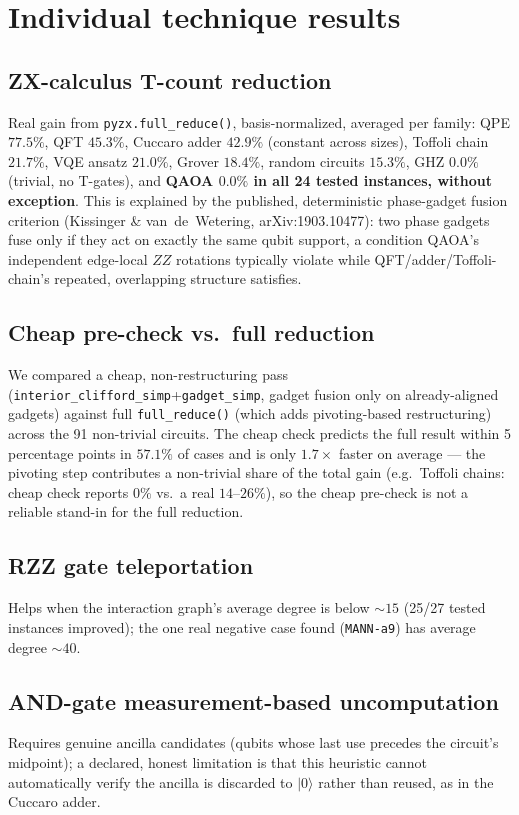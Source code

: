 \documentclass[9pt,twocolumn]{extarticle}
\begin{document}
\section{Individual technique results}
\label{sec:results}

\subsection{ZX-calculus T-count reduction}
Real gain from \texttt{pyzx.full\_reduce()}, basis-normalized, averaged per
family: QPE $77.5\%$, QFT $45.3\%$, Cuccaro adder $42.9\%$ (constant across
sizes), Toffoli chain $21.7\%$, VQE ansatz $21.0\%$, Grover $18.4\%$, random
circuits $15.3\%$, GHZ $0.0\%$ (trivial, no T-gates), and \textbf{QAOA
$0.0\%$ in all 24 tested instances, without exception}. This is explained by
the published, deterministic phase-gadget fusion criterion (Kissinger \&
van~de~Wetering, arXiv:1903.10477): two phase gadgets fuse only if they act
on exactly the same qubit support, a condition QAOA's independent
edge-local $ZZ$ rotations typically violate while QFT/adder/Toffoli-chain's
repeated, overlapping structure satisfies.

\subsection{Cheap pre-check vs.\ full reduction}
We compared a cheap, non-restructuring pass
(\texttt{interior\_clifford\_simp}+\texttt{gadget\_simp}, gadget fusion only
on already-aligned gadgets) against full \texttt{full\_reduce()} (which adds
pivoting-based restructuring) across the 91 non-trivial circuits. The cheap
check predicts the full result within 5 percentage points in $57.1\%$ of
cases and is only $1.7\times$ faster on average --- the pivoting step
contributes a non-trivial share of the total gain (e.g.\ Toffoli chains:
cheap check reports $0\%$ vs.\ a real $14$--$26\%$), so the cheap pre-check is
not a reliable stand-in for the full reduction.

\subsection{RZZ gate teleportation}
Helps when the interaction graph's average degree is below $\sim15$ (25/27
tested instances improved); the one real negative case found
(\texttt{MANN-a9}) has average degree $\sim40$.

\subsection{AND-gate measurement-based uncomputation}
Requires genuine ancilla candidates (qubits whose last use precedes the
circuit's midpoint); a declared, honest limitation is that this heuristic
cannot automatically verify the ancilla is discarded to $|0\rangle$ rather than
reused, as in the Cuccaro adder.
\end{document}
